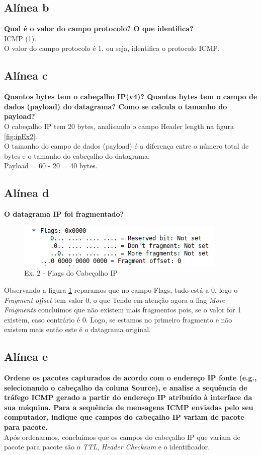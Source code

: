 \documentclass[a4paper]{report}
\begin{document}
\subsection{Alínea b}
\textbf{Qual é o valor do campo protocolo? O que identifica?}\\
ICMP (1).\\
O valor do campo protocolo é 1, ou seja, identifica o protocolo ICMP.

\subsection{Alínea c}
\textbf{Quantos bytes tem o cabeçalho IP(v4)? Quantos bytes tem o
campo de dados (payload) do datagrama? Como se calcula o tamanho 
do payload?}\\
O cabeçalho IP tem 20 bytes, analisando o campo Header length na 
figura \ref{fig:ipEx2}.\\
O tamanho do campo de dados (payload) é a diferença entre o número 
total de bytes e o tamanho do cabeçalho do datagrama:\\
Payload = 60 - 20 = 40 bytes.

\subsection{Alínea d}
\textbf{O datagrama IP foi fragmentado? }

\begin{figure}[H]
    \centering 
    \includegraphics[width=\textwidth]{images/ipEx2Flags.png}
    \caption{Ex. 2 - Flags do Cabeçalho IP}
    \label{fig:ipEx2Flags}
\end{figure}
Observando a figura \ref{fig:ipEx2Flags} reparamos que no 
campo Flags, tudo está a 0, logo o \textit{Fragment offset} tem valor 0, o que
Tendo em atenção agora a flag \textit{More Fragments} concluímos que não existem
mais fragmentos pois, se o valor for 1 existem, caso contrário é 0. Logo,
se estamos no primeiro fragmento e não existem mais então este é o datagrama
original.

\subsection{Alínea e}
\textbf{Ordene os pacotes capturados de acordo com o endereço IP 
fonte (e.g., selecionando o cabeçalho
da coluna Source), e analise a sequência de tráfego ICMP gerado a partir 
do endereço IP atribuído à interface da sua máquina. Para a sequência 
de mensagens ICMP enviadas pelo seu computador, indique que campos do 
cabeçalho IP variam de pacote para pacote.}\\
Após ordenarmos, concluímos que os campos do cabeçalho IP que variam de 
pacote para pacote são o \textit{TTL}, \textit{Header Checksum} e o
identificador.
\end{document}
